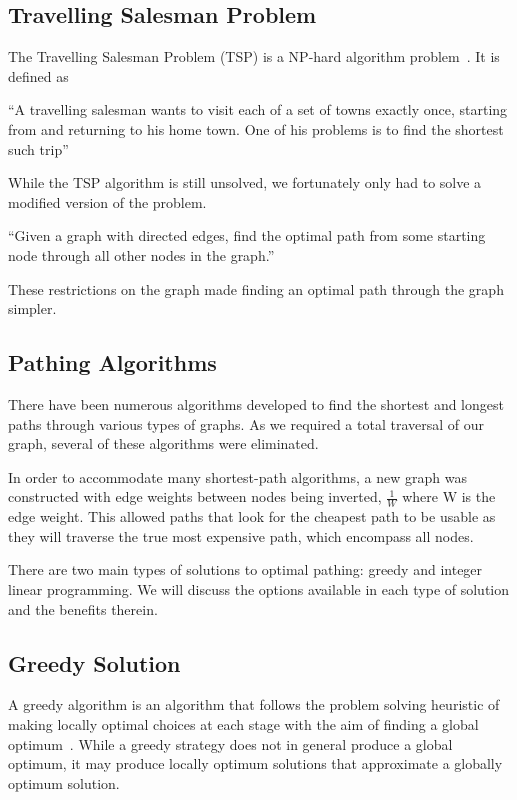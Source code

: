 \documentclass[bsc,frontabs,twoside,singlespacing,parskip,deptreport]{infthesis}     %
\begin{document}
\subsection{Travelling Salesman Problem}
The Travelling Salesman Problem (TSP) is a  NP-hard algorithm problem~\cite{junger1995traveling}.%
It is defined as
\begin{center}
\enquote{A travelling salesman wants to visit each of a set of towns exactly once, starting
from and returning to his home town. One of his problems is to find the shortest
such trip}~\cite{junger1995traveling}
\end{center}

While the TSP algorithm is still unsolved, we fortunately only had to solve a modified version of the problem.\\

\begin{center}
  \enquote{Given a graph with directed edges, find the optimal path from some starting node through all other nodes in
  the graph.}
\end{center}

These restrictions on the graph made finding an optimal path through the graph simpler.


\subsection{Pathing Algorithms}
There have been numerous algorithms developed to find the shortest and longest paths through various types of graphs.
As we required a total traversal of our graph, several of these algorithms were eliminated.

In order to accommodate many shortest-path algorithms, a new graph was constructed with edge weights between nodes being inverted,
$\frac{1}{W}$ where W is the edge weight. This allowed paths that look for the cheapest path to be usable as they will traverse the
true most expensive path, which encompass all nodes.

There are two main types of solutions to optimal pathing: greedy and integer linear programming.
We will discuss the options available in each type of solution and the benefits therein.

\subsection{Greedy Solution}
A greedy algorithm is an algorithm that follows the problem solving heuristic of making locally optimal choices at each stage with the aim
of finding a global optimum~\cite{devore1996some}.
While a greedy strategy does not in general produce a global optimum, it may produce locally optimum solutions that approximate a globally optimum solution.
\end{document}
